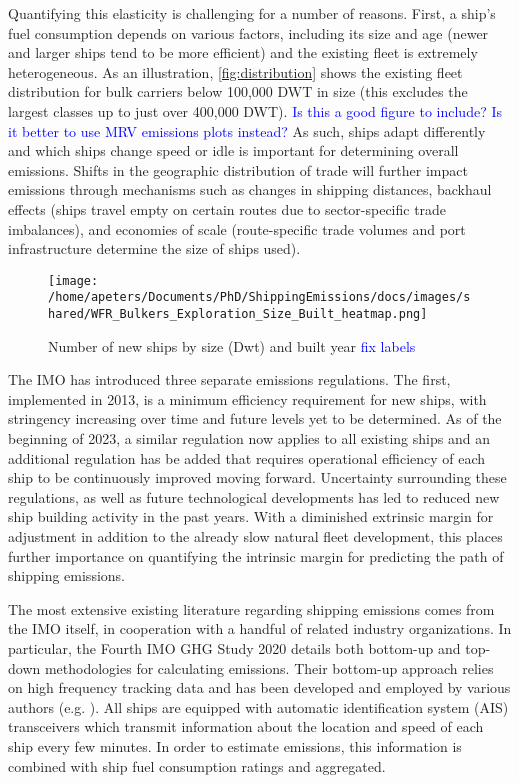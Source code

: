 \documentclass[hidelinks, 12pt,letterpaper]{article}
\begin{document}
Quantifying this elasticity is challenging for a number of reasons. First, a ship's fuel consumption depends on various factors, including its size and age (newer and larger ships tend to be more efficient) and the existing fleet is extremely heterogeneous. As an illustration, \autoref{fig:distribution} shows the existing fleet distribution for bulk carriers below 100,000 DWT in size (this excludes the largest classes up to just over 400,000 DWT). 
\textcolor{blue}{Is this a good figure to include? Is it better to use MRV emissions plots instead?} 
As such, ships adapt differently and which ships change speed or idle is important for determining overall emissions.
Shifts in the geographic distribution of trade will further impact emissions through mechanisms such as changes in shipping distances, backhaul effects (ships travel empty on certain routes due to sector-specific trade imbalances), and economies of scale (route-specific trade volumes and port infrastructure determine the size of ships used).


\begin{figure}[h]
  \centering
  \texttt{[image: /home/apeters/Documents/PhD/ShippingEmissions/docs/images/shared/WFR\_Bulkers\_Exploration\_Size\_Built\_heatmap.png]}
  \caption{Number of new ships by size (Dwt) and built year \textcolor{blue}{fix labels}
}
  \label{fig:distribution}
\end{figure}

The IMO has introduced three separate emissions regulations. The first, implemented in 2013, is a minimum efficiency requirement for new ships, with stringency increasing over time and future levels yet to be determined. As of the beginning of 2023, a similar regulation now applies to all existing ships and an additional regulation has be added that requires operational efficiency of each ship to be continuously improved moving forward. Uncertainty surrounding these regulations, as well as future technological developments has led to reduced new ship building activity in the past years. With a diminished extrinsic margin for adjustment in addition to the already slow natural fleet development, this places further importance on quantifying the intrinsic margin for predicting the path of shipping emissions. 

The most extensive existing literature regarding shipping emissions comes from the IMO itself, in cooperation with a handful of related industry organizations. In particular, the Fourth IMO GHG Study 2020 \citep{faber2020fourth} details both bottom-up and top-down methodologies for calculating emissions. Their bottom-up approach relies on high frequency tracking data and has been developed and employed by various authors (e.g. \citet{olmer2017greenhouse, johansson2017global, jalkanen2009modelling, van2018spatially}). All ships are equipped with automatic identification system (AIS) transceivers which transmit information about the location and speed of each ship every few minutes. In order to estimate emissions, this information is combined with ship fuel consumption ratings and aggregated.
\end{document}
